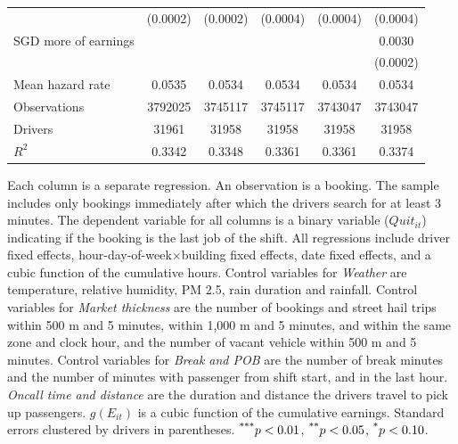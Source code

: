 \documentclass[reviewmode,AEJ]{AEA}
\begin{document}
\begin{table}[]
{\begin{tabularx}{\textwidth}{l@{\extracolsep{\fill}}*{5}{S[table-format = 0.4, table-space-text-pre={**}, table-space-text-post={-**}]}}
                &    (0.0002)         &    (0.0002)         &    (0.0004)         &    (0.0004)         &    (0.0004)         \\
     SGD more of earnings&                     &                     &                     &                     &      0.0030\sym{***}         \\
                &                     &                     &                     &                     &    (0.0002)         \\
    \midrule
    Mean hazard rate&      0.0535         &      0.0534         &      0.0534         &      0.0534         &      0.0534         \\
    Observations&\num{3792025}         &\num{3745117}         &\num{3745117}         &\num{3743047}         &\num{3743047}         \\
    Drivers     & \num{31961}         & \num{31958}         & \num{31958}         & \num{31958}         & \num{31958}         \\
    \(R^2\)     &      0.3342         &      0.3348         &      0.3361         &      0.3361         &      0.3374         \\
    \bottomrule
    \end{tabularx}
    }
	\begin{tablenotes}
	\small
        Each column is a separate regression. An observation is a booking. The sample includes only bookings immediately after which the drivers search for at least 3 minutes. The dependent variable for all columns is a binary variable ($Quit_{it}$) indicating if the booking is the last job of the shift. All regressions include driver fixed effects, hour-day-of-week\(\times\)building fixed effects, date fixed effects, and a cubic function of the cumulative hours. Control variables for \textit{Weather} are temperature, relative humidity, PM 2.5, rain duration and rainfall. Control variables for \textit{Market thickness} are the number of bookings and street hail trips within 500 m and 5 minutes, within 1,000 m and 5 minutes, and within the same zone and clock hour, and the number of vacant vehicle within 500 m and 5 minutes. Control variables for \textit{Break and POB} are the number of break minutes and the number of minutes with passenger from shift start, and in the last hour. \textit{Oncall time and distance} are the duration and distance the drivers travel to pick up passengers. \(g(E_{it})\) is a cubic function of the cumulative earnings. Standard errors clustered by drivers in parentheses. $\textsuperscript{***}p < 0.01$, $\textsuperscript{**}p < 0.05$, $\textsuperscript{*}p < 0.10$. 
	\end{tablenotes}
\end{table}
\end{document}
